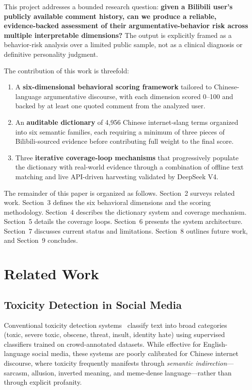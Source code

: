 \documentclass[11pt,a4paper]{article}
\begin{document}
This project addresses a bounded research question: \textbf{given a Bilibili user's
publicly available comment history, can we produce a reliable, evidence-backed assessment
of their argumentative-behavior risk across multiple interpretable dimensions?}
The output is explicitly framed as a behavior-risk analysis over a limited public sample,
not as a clinical diagnosis or definitive personality judgment.

The contribution of this work is threefold:
\begin{enumerate}
  \item A \textbf{six-dimensional behavioral scoring framework} tailored to
    Chinese-language argumentative discourse, with each dimension scored 0--100 and
    backed by at least one quoted comment from the analyzed user.
  \item An \textbf{auditable dictionary} of 4,956 Chinese internet-slang terms organized
    into six semantic families, each requiring a minimum of three pieces of
    Bilibili-sourced evidence before contributing full weight to the final score.
  \item Three \textbf{iterative coverage-loop mechanisms} that progressively populate
    the dictionary with real-world evidence through a combination of offline text
    matching and live API-driven harvesting validated by DeepSeek V4.
\end{enumerate}

The remainder of this paper is organized as follows. Section~2 surveys related work.
Section~3 defines the six behavioral dimensions and the scoring methodology.
Section~4 describes the dictionary system and coverage mechanism.
Section~5 details the coverage loops.
Section~6 presents the system architecture.
Section~7 discusses current status and limitations.
Section~8 outlines future work, and Section~9 concludes.


\section{Related Work}

\subsection{Toxicity Detection in Social Media}

Conventional toxicity detection systems~\cite{davidson2017automated,founta2018unified}
classify text into broad categories (toxic, severe toxic, obscene, threat, insult,
identity hate) using supervised classifiers trained on crowd-annotated datasets.
While effective for English-language social media, these systems are poorly calibrated
for Chinese internet discourse, where toxicity frequently manifests through
\textit{semantic indirection}---sarcasm, allusion, inverted meaning, and meme-dense
language---rather than through explicit profanity.
\end{document}
